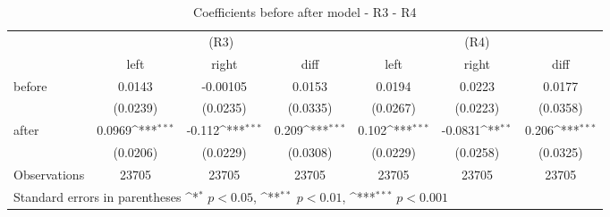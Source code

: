 \begin{table}[!ht]\centering \footnotesize
\def\sym#1{\ifmmode^{#1}\else\(^{#1}\)\fi}
\caption{Coefficients before after model - R3 - R4}
\begin{tabular}{l*{6}{c}}
\hline\hline
                    &\multicolumn{3}{c}{(R3)}&\multicolumn{3}{c}{(R4)}\\
&\multicolumn{1}{c}{left}&\multicolumn{1}{c}{right}&\multicolumn{1}{c}{diff}&\multicolumn{1}{c}{left}&\multicolumn{1}{c}{right}&\multicolumn{1}{c}{diff}\\
\hline
before              &      0.0143         &    -0.00105         &      0.0153         &      0.0194         &      0.0223         &      0.0177         \\
                    &    (0.0239)         &    (0.0235)         &    (0.0335)         &    (0.0267)         &    (0.0223)         &    (0.0358)         \\
[0.5em]
after               &      0.0969\sym{***}&      -0.112\sym{***}&       0.209\sym{***}&       0.102\sym{***}&     -0.0831\sym{**} &       0.206\sym{***}\\
                    &    (0.0206)         &    (0.0229)         &    (0.0308)         &    (0.0229)         &    (0.0258)         &    (0.0325)         \\
\hline
Observations        &       23705         &       23705         &       23705         &       23705         &       23705         &       23705         \\
\hline\hline
\multicolumn{7}{l}{ Standard errors in parentheses \sym{*} \(p<0.05\), \sym{**} \(p<0.01\), \sym{***} \(p<0.001\)}\\
\end{tabular}
\end{table}
